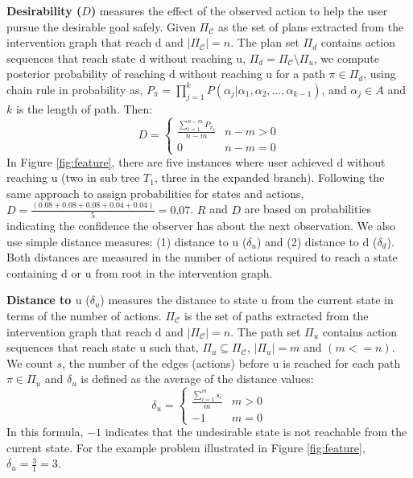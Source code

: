\documentclass[letterpaper]{article}
\theoremstyle{plain}
\begin{document}
\textbf{Desirability ($D$)} measures the effect of the observed action to help the user pursue the desirable goal safely. Given $\Pi_{\mathcal{C}}$ as the set of plans extracted from the intervention graph that reach $\mathrm{d}$ and $\left | \Pi_{\mathcal{C}} \right |=n$. The plan set $\Pi_{d}$ contains action sequences that reach state $\mathrm{d}$ without reaching $\mathrm{u}$, $\Pi_{d} = \Pi_{\mathcal{C}} \setminus \Pi_{u} $, we compute  posterior probability of reaching $\mathrm{d}$ without reaching $\mathrm{u}$ for a path $\pi \in \Pi_{d}$, using chain rule in probability as, $P_{\pi}=\prod_{j=1}^{k}P(\alpha_j|\alpha_1, \alpha_2,...,\alpha_{k-1})$, and $\alpha_{j} \in A$ and $k$ is the length of path. Then:
\begin{equation*} 
D = \left\{\begin{matrix}
\frac{\sum_{i=1}^{n-m}P_{\pi_i}}{n-m} & n-m>0\\ 
0 &  n-m=0
\end{matrix}\right.
\end{equation*} 
In Figure \ref{fig:feature}, there are five instances where user achieved $\mathrm{d}$  without reaching $\mathrm{u}$ (two in sub tree $T_1$, three in the expanded branch). Following the same approach to assign probabilities for states and actions, $D= \frac{(0.08+0.08+0.08+0.04+0.04)}{5} = 0.07$.
$R$ and $D$ are based on probabilities indicating the confidence the observer has about the next observation. We also use simple distance measures: (1) distance to $\mathrm{u}$  ($\delta_u$) and (2) distance to $\mathrm{d}$ ($\delta_d$). Both distances are measured in the number of actions required to reach a state containing $\mathrm{d}$ or $\mathrm{u}$ from root in the intervention graph.  

\textbf{Distance to $\boldsymbol{\mathrm{u}}$} ($\delta_u$) measures the distance to state $\mathrm{u}$ from the current state in terms of the number of actions. $\Pi_{\mathcal{C}}$ is the set of paths extracted from the intervention graph that reach $\mathrm{d}$ and $\left | \Pi_{\mathcal{C}} \right |=n$. The path set $\Pi_{u}$ contains action sequences that reach state $\mathrm{u}$ such that, $\Pi_{u} \subseteq \Pi_{\mathcal{C}}$, $\left | \Pi_{u} \right |=m$ and $(m<=n)$. We count  $s$, the number of the edges (actions) before $\mathrm{u}$ is reached for each path $\pi \in \Pi_{u}$ and $\delta_u$ is defined as the average of the distance values:
\begin{equation*} 
\delta_u = \left\{\begin{matrix}
\frac{\sum_{i=1}^{m}s_i}{m} & m>0\\ 
-1 &  m=0
\end{matrix}\right.
\end{equation*} 
In this formula, $-1$ indicates that the undesirable state is not reachable from the current state. For the example problem illustrated in Figure \ref{fig:feature}, $\delta_u=\frac{3}{1}=3$. 
\end{document}
